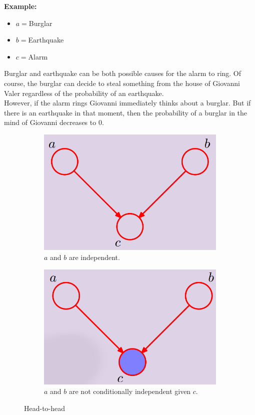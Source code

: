 \textbf{Example:}
\begin{itemize}
    \item $a=$Burglar
    \item $b=$Earthquake
    \item $c=$Alarm
\end{itemize}
Burglar and earthquake can be both possible causes for the alarm to ring. Of course, the burglar can decide to steal something from the house of Giovanni Valer regardless of the probability of an earthquake.\\
However, if the alarm rings Giovanni immediately thinks about a burglar. But if there is an earthquake in that moment, then the probability of a burglar in the mind of Giovanni decreases to 0.

\begin{figure}
\centering
\begin{subfigure}[t]{0.49\textwidth}
\centering
\includegraphics[width=\linewidth]{images/headToHead.png} 
\caption{$a$ and $b$ are independent.}
\label{fig:unSelectedHeadToHead}
\end{subfigure}
\hfill
\begin{subfigure}[t]{0.49\textwidth}
\centering
\includegraphics[width=\linewidth]{images/headToHeadSelected.png}
\caption{$a$ and $b$ are not conditionally independent given $c$.}
\label{fig:selectedHeadToHead}
\end{subfigure}

\caption{Head-to-head}
\label{fig:head-to-head}
\end{figure}

